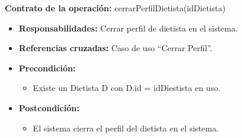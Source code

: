 \textbf{Contrato de la operación:} cerrarPerfilDietista(idDietista)
\begin{itemize}
\item \textbf{Responsabilidades:} Cerrar perfil de dietista en el sistema.
\item \textbf{Referencias cruzadas:} Caso de uso ``Cerrar Perfil''.
\item \textbf{Precondición:}
\begin{itemize}
\item Existe un Dietista D con D.id = idDiestista en uso.
\end{itemize}
\item \textbf{Postcondición:}
\begin{itemize}
\item El sistema cierra el perfil del dietista en el sistema.
\end{itemize}
\end{itemize}

